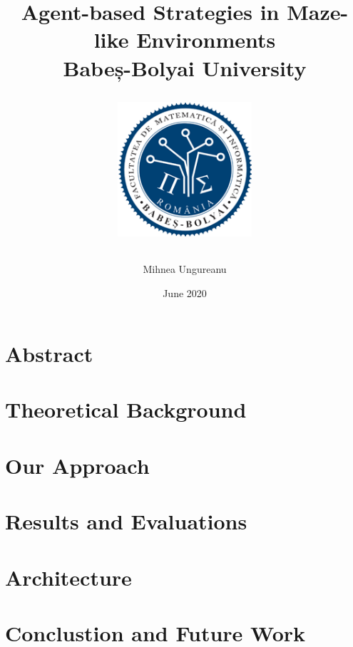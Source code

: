 \documentclass[12pt,twoside]{report}
\title{
    {Agent-based Strategies in Maze-like Environments}\\
    {\large Babeș-Bolyai University}\\
    {
        \begin{figure}[h]
            \includegraphics[width=5cm]{logo_cs.png}
            \centering
        \end{figure}
    }
}
\author{Mihnea Ungureanu}
\date{June 2020}
\begin{document}
\maketitle

\chapter*{Abstract}

\tableofcontents

\chapter{Theoretical Background}


\chapter{Our Approach}


\chapter{Results and Evaluations}


\chapter{Architecture}


\chapter{Conclustion and Future Work}



\end{document}
